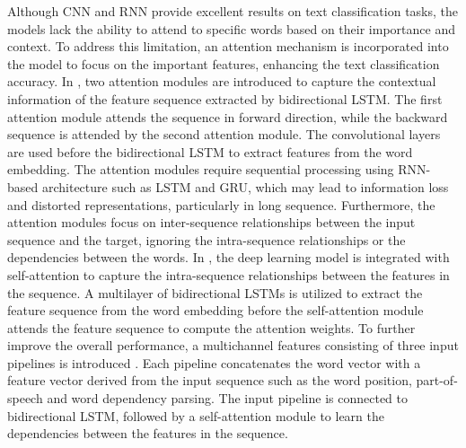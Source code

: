 \documentclass[preprint,12pt]{elsarticle}
\begin{document}
Although CNN and RNN provide excellent results on text classification tasks, the models lack the ability to attend to specific words based on their importance and context. To address this limitation, an attention mechanism is incorporated into the model to focus on the important features, enhancing the text classification accuracy. In \citep{liu_bidirectional_2019}, two attention modules are introduced to capture the contextual information of the feature sequence extracted by bidirectional LSTM. The first attention module attends the sequence in forward direction, while the backward sequence is attended by the second attention module. The convolutional layers are used before the bidirectional LSTM to extract features from the word embedding. The attention modules require sequential processing using RNN-based architecture such as LSTM and GRU, which may lead to information loss and distorted representations, particularly in long sequence. Furthermore, the attention modules focus on inter-sequence relationships between the input sequence and the target, ignoring the intra-sequence relationships or the dependencies between the words. In \citep{lin_structured_2017}, the deep learning model is integrated with self-attention to capture the intra-sequence relationships between the features in the sequence. A multilayer of bidirectional LSTMs is utilized to extract the feature sequence from the word embedding before the self-attention module attends the feature sequence to compute the attention weights. To further improve the overall performance, a multichannel features consisting of three input pipelines is introduced \citep{li_bidirectional_2020}. Each pipeline concatenates the word vector with a feature vector derived from the input sequence such as the word position, part-of-speech and word dependency parsing. The input pipeline is connected to bidirectional LSTM, followed by a self-attention module to learn the dependencies between the features in the sequence.
\end{document}
